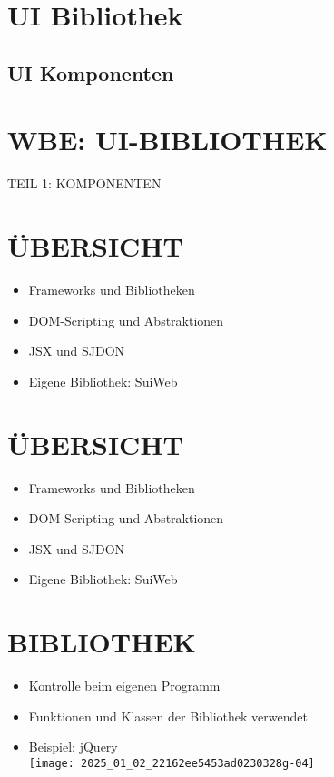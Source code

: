 \section{UI Bibliothek}
 
\subsection{UI Komponenten}

\section*{WBE: UI-BIBLIOTHEK}
 TEIL 1: KOMPONENTEN\section*{ÜBERSICHT}
\begin{itemize}
  \item Frameworks und Bibliotheken
  \item DOM-Scripting und Abstraktionen
  \item JSX und SJDON
  \item Eigene Bibliothek: SuiWeb
\end{itemize}

\section*{ÜBERSICHT}
\begin{itemize}
  \item Frameworks und Bibliotheken
  \item DOM-Scripting und Abstraktionen
  \item JSX und SJDON
  \item Eigene Bibliothek: SuiWeb
\end{itemize}

\section*{BIBLIOTHEK}
\begin{itemize}
  \item Kontrolle beim eigenen Programm
  \item Funktionen und Klassen der Bibliothek verwendet
  \item Beispiel: jQuery\\
\texttt{[image: 2025\_01\_02\_22162ee5453ad0230328g-04]}
\end{itemize}


